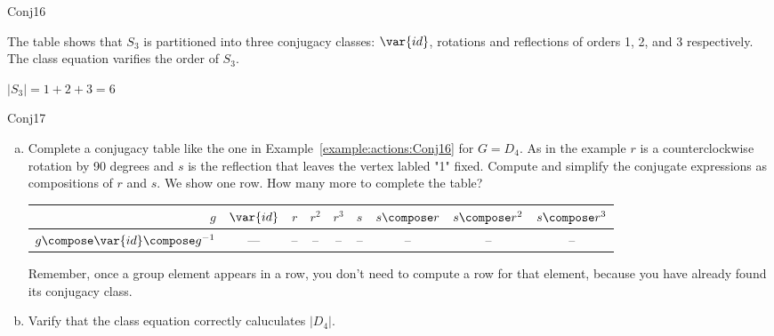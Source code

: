 \begin {example}{Conj16}

The table shows that $S_3$ is partitioned into  three conjugacy classes: $\var{id}$, rotations and reflections of orders 1, 2, and 3 respectively.  The class equation varifies the order of $S_3$.

$|S_3|=1+2+3=6$
\end{example}

\begin {exercise}{Conj17}
\begin {enumerate}[(a)]
\item Complete a conjugacy table like the one in  Example~\ref{example:actions:Conj16} for $G=D_4$. As in the example $r$ is a counterclockwise rotation by 90 degrees and $s$ is the reflection that leaves the vertex labled "1" fixed. Compute and simplify the conjugate expressions as compositions of $r$ and $s$. We show one row.  How many more to complete the table?

\begin{center}

\begin{tabular}{ |r| c | c |c |c |c |c | c|c |} \hline
  $g$ &$\var{id}$ & $r$ &$r^2$ &$r^3$ & $s$ &$s\compose r$ & $s\compose r ^2$ & $s\compose r^3$\\ \hline
  $g\compose \var{id}\compose g^{-1}$ &--- & -- & -- &-- &--&--&--&-- \\
\end{tabular}
\end{center}

 Remember, once a group element appears in a row, you don't need to compute a row for that element, because you have already found its conjugacy class.
\item Varify that the class equation correctly caluculates $|D_4|$.
\end{enumerate}
\end{exercise}

